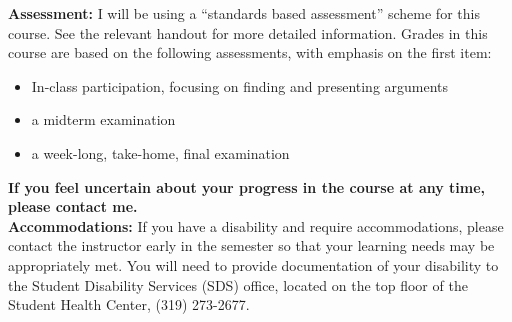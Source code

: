 \documentclass[12pt]{amsart}
\begin{document}
\textbf{Assessment:}
I will be using a “standards based assessment” scheme for this course. 
See the relevant handout for more detailed information. 
Grades in this course are based on the following assessments, with emphasis on the first item:
\begin{itemize}
    \item In-class participation, focusing on finding and presenting arguments
    \item a midterm examination
    \item a week-long, take-home, final examination
\end{itemize}
\textbf{If you feel uncertain about your progress in the course at any time, please contact me.}\\[.1in]

\textbf{Accommodations:}
If you have a disability and require accommodations, please contact the instructor early in the semester so that your learning needs may be appropriately met. 
You will need to provide documentation of your disability to the Student Disability Services (SDS) office, located on the top floor of the Student Health Center, (319) 273-2677.
\end{document}
